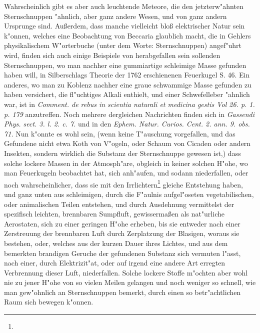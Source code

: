 \documentclass[a4paper, 11pt, oneside, polutonikogreek, german]{article}
\begin{document}
Wahrscheinlich gibt es aber auch leuchtende Meteore, die den jetzterw"ahnten Sternschnuppen "ahnlich, aber ganz andere Wesen, und von ganz andern Ursprunge sind. Außerdem, dass manche vielleicht bloß elektrischer Natur sein k"onnen, welches eine Beobachtung von Beccaria glaublich macht, die in Gehlers physikalischem W"orterbuche (unter dem Worte: Sternschnuppen) angef"uhrt wird, finden sich auch einige Beispiele von herabgefallen sein sollenden Sternschnuppen, wo man nachher eine gummiartige schleimige Masse gefunden haben will, in Silberschlags Theorie der 1762 erschienenen Feuerkugel S. 46. Ein anderes, wo man zu Koblenz nachher eine graue schwammige Masse gefunden zu haben versichert, die fl"uchtiges Alkali enthielt, und einer Schwefelleber "ahnlich war, ist in \emph{Comment. de rebus in scientia naturali et medicina gestis Vol 26. p. 1. p. 179} anzutreffen. Noch mehrere dergleichen Nachrichten finden sich in \emph{Gassendi Phys. sect. 3. l. 2. c. 7.} und in den \emph{Ephem. Natur. Curios. Cent. 2. ann. 9. obs. 71.} Nun k"onnte es wohl sein, (wenn keine T"auschung vorgefallen, und das Gefundene nicht etwa Koth von V"ogeln, oder Schaum von Cicaden oder andern Insekten, sondern wirklich die Substanz der Sternschnuppe gewesen ist,) dass solche lockere Massen in der Atmosph"are, obgleich in keiner solchen H"ohe, wo man Feuerkugeln beobachtet hat, sich anh"aufen, und sodann niederfallen, oder noch wahrscheinlicher, dass sie mit den Irrlichtern\footnote{} gleiche Entstehung haben, und ganz unten aus schleimigen, durch die F"aulnis aufgel"oseten vegetabilischen, oder animalischen Teilen entstehen, und durch Ausdehnung vermittelst der spezifisch leichten, brennbaren Sumpfluft, gewissermaßen als nat"urliche Aerostaten, sich zu einer geringen H"ohe erheben, bis sie entweder nach einer Zerstreuung der brennbaren Luft durch Zerplatzung der Blasigen, woraus sie bestehen, oder, welches aus der kurzen Dauer ihres Lichtes, und aus dem bemerkten brandigen Geruche der gefundenen Substanz sich vermuten l"asst, nach einer, durch Elektrizit"at, oder auf irgend eine andere Art erregten Verbrennung dieser Luft, niederfallen. Solche lockere Stoffe m"ochten aber wohl nie zu jener H"ohe von so vielen Meilen gelangen und noch weniger so schnell, wie man gew"ohnlich an Sternschnuppen bemerkt, durch einen so betr"achtlichen Raum sich bewegen k"onnen.
\clearpage
\end{document}

